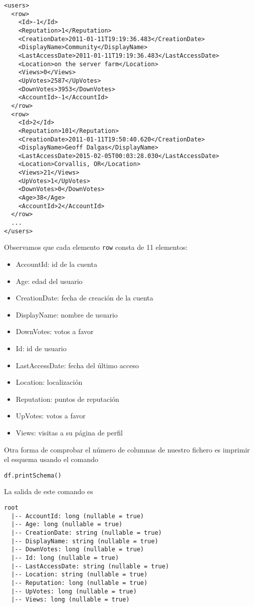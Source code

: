 \documentclass[12pt,a4paper,twoside,openright,titlepage,final]{article}
\begin{document}
\begin{verbatim}
<users>
  <row>
    <Id>-1</Id>
    <Reputation>1</Reputation>
    <CreationDate>2011-01-11T19:19:36.483</CreationDate>
    <DisplayName>Community</DisplayName>
    <LastAccessDate>2011-01-11T19:19:36.483</LastAccessDate>
    <Location>on the server farm</Location>
    <Views>0</Views>
    <UpVotes>2587</UpVotes>
    <DownVotes>3953</DownVotes>
    <AccountId>-1</AccountId>
  </row>
  <row>
    <Id>2</Id>
    <Reputation>101</Reputation>
    <CreationDate>2011-01-11T19:50:40.620</CreationDate>
    <DisplayName>Geoff Dalgas</DisplayName>
    <LastAccessDate>2015-02-05T00:03:28.030</LastAccessDate>
    <Location>Corvallis, OR</Location>
    <Views>21</Views>
    <UpVotes>1</UpVotes>
    <DownVotes>0</DownVotes>
    <Age>38</Age>
    <AccountId>2</AccountId>
  </row>
  ...
</users>
\end{verbatim}

Observamos que cada elemento \texttt{row} consta de 11 elementos:

\begin{itemize}
	\item AccountId: id de la cuenta
	\item Age: edad del usuario
	\item CreationDate: fecha de creación de la cuenta
	\item DisplayName: nombre de usuario
	\item DownVotes: votos a favor
	\item Id: id de usuario
	\item LastAccessDate: fecha del último acceso
	\item Location: localización
	\item Reputation: puntos de reputación
	\item UpVotes: votos a favor
	\item Views: visitas a su página de perfil
\end{itemize}

Otra forma de comprobar el número de columnas de nuestro fichero es imprimir el esquema usando el comando

\begin{verbatim}
df.printSchema()
\end{verbatim}

La salida de este comando es

\begin{verbatim}
root
  |-- AccountId: long (nullable = true)
  |-- Age: long (nullable = true)
  |-- CreationDate: string (nullable = true)
  |-- DisplayName: string (nullable = true)
  |-- DownVotes: long (nullable = true)
  |-- Id: long (nullable = true)
  |-- LastAccessDate: string (nullable = true)
  |-- Location: string (nullable = true)
  |-- Reputation: long (nullable = true)
  |-- UpVotes: long (nullable = true)
  |-- Views: long (nullable = true)
\end{verbatim}
\end{document}
